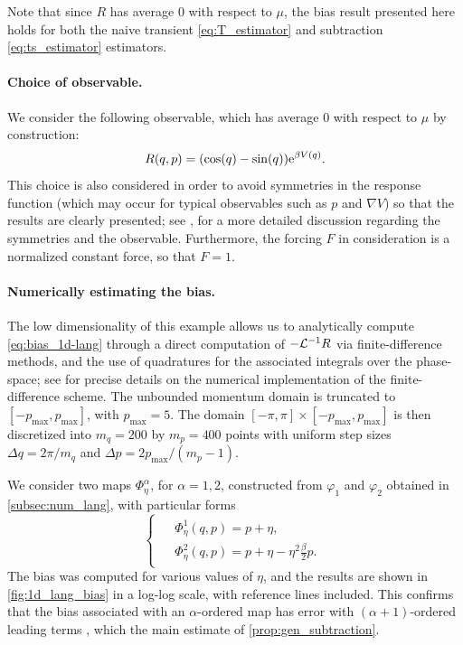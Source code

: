 Note that since $R$ has average 0 with respect to $\mu$, the bias result presented here holds for both the naive transient \eqref{eq:T_estimator} and subtraction \eqref{eq:ts_estimator} estimators.

\paragraph{Choice of observable.} We consider the following observable, which has average 0 with respect to $\mu$ by construction: 
%
\begin{equation}
	R(q,p) = \paren*{\cos(q) - \sin(q)} \e^{\beta V(q)}.
	\label{eq:R_observable}
\end{equation}
%
This choice is also considered in order to avoid symmetries in the response function (which may occur for typical observables such as $p$ and $\nabla V$) so that the results are clearly presented; see \cite[Section 4.2]{synthetic2023}, for a more detailed discussion regarding the symmetries and the observable. Furthermore, the forcing $F$ in consideration is a normalized constant force, so that $F = 1$.

\paragraph{Numerically estimating the bias.} The low dimensionality of this example allows us to analytically compute \eqref{eq:bias_1d-lang} through a direct computation of $-\mathcal{L}^{-1}R$ via finite-difference methods, and the use of quadratures for the associated integrals over the phase-space; see \cite[Appendix B]{synthetic2023} for precise details on the numerical implementation of the finite-difference scheme. The unbounded momentum domain is truncated to $[-p_\mathrm{max},p_\mathrm{max}]$, with $p_\mathrm{max} = 5$. The domain $[-\pi,\pi] \times [-p_\mathrm{max},p_\mathrm{max}]$ is then discretized into $m_q = 200$ by $m_p = 400$ points with uniform step sizes $\Delta q = 2\pi/m_q$ and $\Delta p = 2p_\mathrm{max}/(m_p-1)$. 

We consider two maps $\Phi_\eta^\alpha$, for $\alpha=1,2$, constructed from $\varphi_1$ and $\varphi_2$ obtained in \cref{subsec:num_lang}, with particular forms
%
\begin{equation}
\begin{cases}
\begin{aligned}
	&\Phi_\eta^1(q,p) = p + \eta, \\
	&\Phi_\eta^2(q,p) = p + \eta - \eta^2\frac{\beta}{2}p.
\end{aligned}
\end{cases}
\end{equation}
%
The bias was computed for various values of $\eta$, and the results are shown in \cref{fig:1d_lang_bias} in a log-log scale, with reference lines included. This confirms that the bias associated with an $\alpha$-ordered map has error with $(\alpha+1)$-ordered leading terms , which the main estimate of \cref{prop:gen_subtraction}.

